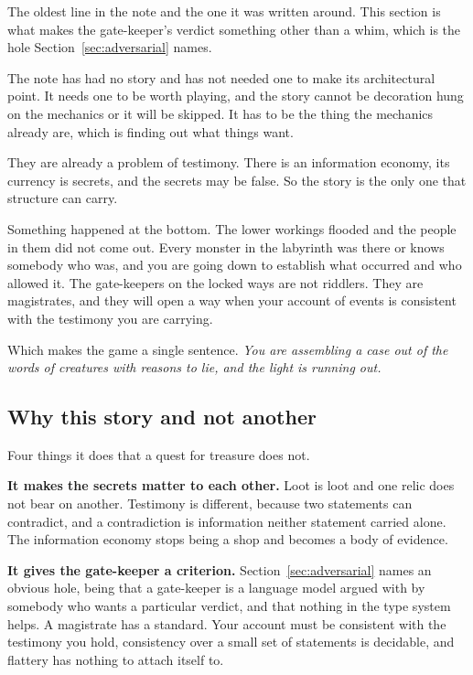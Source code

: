 \documentclass[11pt,a4paper]{article}
\begin{document}
The oldest line in the note and the one it was written around. This section is what makes the
gate-keeper's verdict something other than a whim, which is the hole Section~\ref{sec:adversarial}
names.


The note has had no story and has not needed one to make its architectural point. It needs one to
be worth playing, and the story cannot be decoration hung on the mechanics or it will be skipped.
It has to be the thing the mechanics already are, which is finding out what things want.

They are already a problem of testimony. There is an information economy, its currency is secrets,
and the secrets may be false. So the story is the only one that structure can carry.

\begin{sectionbox}
Something happened at the bottom. The lower workings flooded and the people in them did not come
out. Every monster in the labyrinth was there or knows somebody who was, and you are going down to
establish what occurred and who allowed it. The gate-keepers on the locked ways are not riddlers. They
are magistrates, and they will open a way when your account of events is consistent with the
testimony you are carrying.
\end{sectionbox}

Which makes the game a single sentence. \emph{You are assembling a case out of the words of
creatures with reasons to lie, and the light is running out.}

\subsection{Why this story and not another}

Four things it does that a quest for treasure does not.

\textbf{It makes the secrets matter to each other.} Loot is loot and one relic does not bear on
another. Testimony is different, because two statements can contradict, and a contradiction is
information neither statement carried alone. The information economy stops being a shop and
becomes a body of evidence.

\textbf{It gives the gate-keeper a criterion.} Section~\ref{sec:adversarial} names an obvious hole,
being that a gate-keeper is a language model argued with by somebody who wants a particular verdict,
and that nothing in the type system helps. A magistrate has a standard. Your account must be
consistent with the testimony you hold, consistency over a small set of statements is decidable,
and flattery has nothing to attach itself to.
\end{document}
